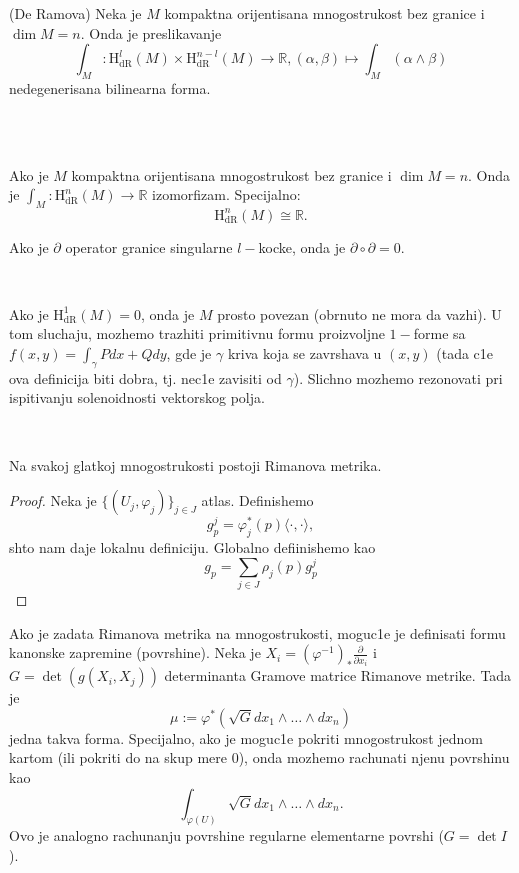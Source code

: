 \documentclass[a4paper,12pt]{article}
\newcommand{\RR}{\mathbb{R}}
\newcommand{\hdr}[1]{\mathrm{H}_\mathrm{dR}^{#1}}
\begin{document}
\begin{tma}(De Ramova)
	Neka je $M$ kompaktna orijentisana mnogostrukost bez granice i $\dim M = n$. Onda je preslikavanje
	\[ \int_M: \hdr{l}(M) \times \hdr{n - l}(M) \to \RR, (\alpha, \beta) \mapsto \int_M(\alpha\wedge\beta) \] 
	nedegenerisana bilinearna forma.
\end{tma}
\\ \\
\begin{posl}
	Ako je $M$ kompaktna orijentisana mnogostrukost bez granice i $\dim M = n$. Onda je 
	$\int_M:\hdr n (M) \to \RR$ izomorfizam. Specijalno: 
	\[ \hdr n (M) \cong \RR.\] 
\end{posl}

\begin{tvr}
	Ako je $\partial$ operator granice singularne $l-$kocke, onda je $\partial \circ \partial = 0$.
\end{tvr}\\ 

\begin{nap}
	Ako je $\hdr 1(M) = 0$, onda je $M$ prosto povezan (obrnuto ne mora da vazhi). U tom sluchaju, mozhemo
	trazhiti primitivnu formu proizvoljne $1-$forme sa $f(x, y) = \int_\gamma Pdx + Qdy$, gde je $\gamma$ kriva
	koja se zavrshava u $(x, y)$ (tada c1e ova definicija biti dobra, tj. nec1e zavisiti od $\gamma$). Slichno mozhemo
	rezonovati pri ispitivanju solenoidnosti vektorskog polja.
\end{nap}\\

\begin{tvr}
	Na svakoj glatkoj mnogostrukosti postoji Rimanova metrika.
\end{tvr}
\begin{proof}
	Neka je $\{(U_j, \varphi_j)\}_{j \in J}$ atlas. Definishemo
	\[ g^j_p = \varphi_j^*(p)\langle \cdot, \cdot \rangle ,\] 
	shto nam daje lokalnu definiciju. Globalno defiinishemo kao
	\[ g_p = \sum_{j \in J} \rho_j(p) g^j_p\]
\end{proof}

\begin{nap}
	Ako je zadata Rimanova metrika na mnogostrukosti, moguc1e je definisati formu kanonske zapremine (povrshine).
	Neka je $X_i = (\varphi^{-1})_* \frac{\partial}{\partial x_i}$ i $G = \det(g(X_i, X_j))$ determinanta Gramove 
	matrice Rimanove metrike. Tada je 
	\[ \mu := \varphi^*(\sqrt G dx_1\wedge \dotso \wedge dx_n) \] 
	jedna takva forma. Specijalno, ako je moguc1e pokriti mnogostrukost jednom kartom (ili pokriti do na skup mere $0$),
	onda mozhemo rachunati njenu povrshinu kao 
	\[ \int_{\varphi(U)} \sqrt Gdx_1\wedge \dotso \wedge dx_n  .\] 
	Ovo je analogno rachunanju povrshine regularne elementarne povrshi ($G = \det I$).
\end{nap}\\
\end{document}
